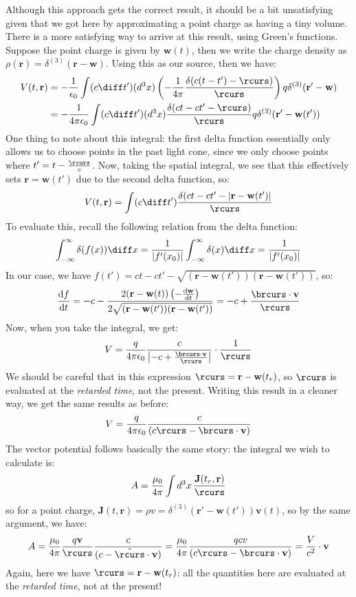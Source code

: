 Although this approach gets the correct result, it should be a bit unsatisfying given that we got here by
approximating a point charge as having a tiny volume. There is a more satisfying way to arrive at this
result, using Green's functions. Suppose the point charge is given by \( \mathbf{w}(t) \), then we write the
charge density as \( \rho(\mathbf{r}) = \delta^{(3)}(\mathbf{r} - \mathbf{w}) \). Using this as our source,
then we have:
\begin{align*}
	V(t, \mathbf{r}) &= -\frac{1}{\epsilon_0} \int (c \diff t') (d^3x) \left( -\frac{1}{4\pi} \frac{\delta(c(t
	- t') - \rcurs)}{\rcurs} \right) q \delta^{(3)}(\mathbf{r}' - \mathbf{w})\\
	&= -\frac{1}{4\pi \epsilon_0}\int (c \diff t') (d^3x) \frac{\delta(ct - ct' - \rcurs)}{\rcurs}q
	\delta^{(3)}(\mathbf{r}' - \mathbf{w}(t'))
\end{align*}
One thing to note about this integral: the first delta function essentially only allows us to choose points in the
past light cone, since we only choose points where \( t' = t - \frac{\rcurs}{c} \). Now, taking the spatial
integral, we see that this effectively sets \( \mathbf{r} = \mathbf{w}(t') \) due to the second delta
function, so:
\[
	V(t, \mathbf{r}) = \int (c \diff t') \frac{\delta(ct - ct' - |\mathbf{r} - \mathbf{w}(t')|}{\rcurs}
\]
To evaluate this, recall the following relation from the delta function:
\[
	\int_{-\infty}^{\infty} \delta(f(x)) \diff x = \frac{1}{|f'(x_0)|}\int_{-\infty}^{\infty}\delta(x) \diff
	x = \frac{1}{|f'(x_0)|}
\]
In our case, we have \( f(t') = ct - ct' - \sqrt{(\mathbf{r} - \mathbf{w}(t'))(\mathbf{r} - \mathbf{w}(t'))}
\), so:
\[
	\dv{f}{t} = -c - \frac{2(\mathbf{r} - \mathbf{w}(t))\left( -\dv{\mathbf{w}}{t} \right)}{2
	\sqrt{(\mathbf{r} - \mathbf{w}(t'))(\mathbf{r} - \mathbf{w}(t'))}} = -c + \frac{\brcurs \cdot
\mathbf{v}}{\rcurs}
\]
Now, when you take the integral, we get:
\[
	V = \frac{q}{4\pi \epsilon_0} \frac{c}{\left| -c + \frac{\brcurs \cdot \mathbf{v}}{\rcurs} \right|} \cdot
	\frac{1}{\rcurs}
\]
We should be careful that in this expression \( \rcurs = \mathbf{r} - \mathbf{w}(t_r) \), so \( \rcurs \) is
evaluated at the \textit{retarded time}, not the present. Writing this result in a cleaner way, we get the
same results as before:   
\[
	V = \frac{q}{4\pi \epsilon_0} \frac{c}{(c \rcurs - \brcurs \cdot \mathbf{v})}
\]
The vector potential follows basically the same story: the integral we wish to calculate is:
\[
	A = \frac{\mu_0}{4\pi}\int d^3x \, \frac{\mathbf{J}(t_r, \mathbf{r})}{\rcurs}
\]
so for a point charge, \( \mathbf{J}(t, \mathbf{r}) = \rho v = \delta^{(3)}(\mathbf{r}' - \mathbf{w}(t'))
\mathbf{v}(t) \), so by the same argument, we have:
\[
	A = \frac{\mu_0}{4\pi}\frac{q\mathbf{v}}{\rcurs} \frac{c}{(c - \hat{\rcurs} \cdot \mathbf{v})} =
	\frac{\mu_0}{4\pi}\frac{qcv}{(c\rcurs - \brcurs \cdot \mathbf{v})} = \frac{V}{c^2} \cdot \mathbf{v}
\]
Again, here we have \( \rcurs = \mathbf{r} - \mathbf{w}(t_r) \): all the quantities here are evaluated at the
\textit{retarded time}, not at the present!
 

